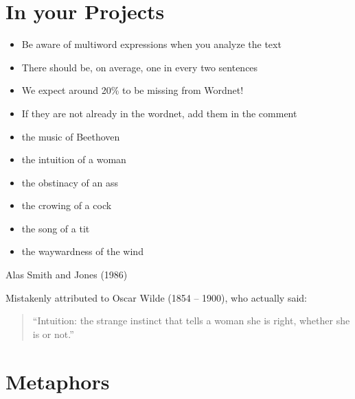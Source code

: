 \documentclass[a4paper,landscape,headrule,footrule,xetex]{foils}
\begin{document}
\section{In your  Projects}

\begin{itemize}
\item Be aware of multiword expressions when you analyze the text
\item There should be, on average, one in every two sentences
\item We expect around 20\% to be missing from Wordnet!  
\item If they are not already in the wordnet, add them in the comment
\end{itemize}





\begin{itemize} \addtolength{\itemsep}{-1ex}
\item the music of Beethoven
\item the intuition of a woman
\item the obstinacy of an ass
\item the crowing of a cock
\item the song of a tit
\item the waywardness of the wind
\end{itemize}
\begin{flushright}
  Alas Smith and Jones (1986)
\end{flushright}
Mistakenly attributed to Oscar Wilde (1854 – 1900), who actually said:
\begin{quote}
``Intuition: the strange instinct that tells a woman she is right, whether she is or not.''  
\end{quote}



\section{Metaphors}
\end{document}
